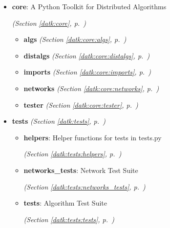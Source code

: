\begin{itemize}
\setlength{\parskip}{0ex}
\item \textbf{core}: A Python Toolkit for Distributed Algorithms



  \textit{(Section \ref{datk:core}, p.~\pageref{datk:core})}

  \begin{itemize}
\setlength{\parskip}{0ex}
    \item \textbf{algs}
  \textit{(Section \ref{datk:core:algs}, p.~\pageref{datk:core:algs})}

    \item \textbf{distalgs}
  \textit{(Section \ref{datk:core:distalgs}, p.~\pageref{datk:core:distalgs})}

    \item \textbf{imports}
  \textit{(Section \ref{datk:core:imports}, p.~\pageref{datk:core:imports})}

    \item \textbf{networks}
  \textit{(Section \ref{datk:core:networks}, p.~\pageref{datk:core:networks})}

    \item \textbf{tester}
  \textit{(Section \ref{datk:core:tester}, p.~\pageref{datk:core:tester})}

  \end{itemize}
\item \textbf{tests}
  \textit{(Section \ref{datk:tests}, p.~\pageref{datk:tests})}

  \begin{itemize}
\setlength{\parskip}{0ex}
    \item \textbf{helpers}: Helper functions for tests in tests.py



  \textit{(Section \ref{datk:tests:helpers}, p.~\pageref{datk:tests:helpers})}

    \item \textbf{networks\_tests}: Network Test Suite



  \textit{(Section \ref{datk:tests:networks_tests}, p.~\pageref{datk:tests:networks_tests})}

    \item \textbf{tests}: Algorithm Test Suite



  \textit{(Section \ref{datk:tests:tests}, p.~\pageref{datk:tests:tests})}

  \end{itemize}
\end{itemize}


